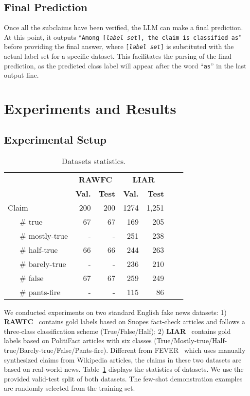 \documentclass[11pt]{article}
\begin{document}
\subsection{Final Prediction} Once all the subclaims have been verified, the LLM can make a final prediction. At this point, it outputs ``\texttt{Among [\textit{label set}], the claim is classified as}'' before providing the final answer, where \texttt{[\textit{label set}]} is substituted with the actual label set for a specific dataset. This facilitates the parsing of the final prediction, as the predicted class label will appear after the word ``\texttt{as}'' in the last output line.

\section{Experiments and Results}
\subsection{Experimental Setup}
\begin{table}[t!]
\centering

\begin{tabular}{lrrrrrr}
\toprule

& \multicolumn{2}{c}{\textbf{RAWFC}}&\multicolumn{2}{c}{\textbf{LIAR}}\\

 \cmidrule(lr){2-3} \cmidrule(lr){4-5}
 & \textbf{Val.} & \textbf{Test}& \textbf{Val.} & \textbf{Test}\\
 \midrule
Claim & 200 & 200& 1274 & 1,251  \\
~~~\# true & 67 & 67& 169 & 205  \\
~~~\# mostly-true&-&- & 251 & 238  \\
~~~\# half-true & 66 & 66 & 244 & 263  \\
~~~\# barely-true&-&- & 236 & 210  \\
~~~\# false& 67 & 67 & 259 & 249 \\
~~~\# pants-fire&-&- & 115 & 86 \\
\bottomrule

\end{tabular}
\caption{Datasets statistics.}
\label{tbl_datasta}

\end{table}
We conducted experiments on two standard English fake news datasets: 1)  \textbf{RAWFC}~\cite{yang2022coarse} contains gold labels based on Snopes fact-check articles and follows a three-class classification scheme (True/False/Half); 2) \textbf{LIAR}~\cite{wang2017liar} contains gold labels based on PolitiFact articles with six classes (True/Mostly-true/Half-true/Barely-true/False/Pants-fire). Different from FEVER~\cite{thorne2018fever} which uses manually synthesized claims from  Wikipedia articles, the claims in these two datasets are based on real-world news. 
Table~\ref{tbl_datasta} displays the statistics of datasets. We use the provided valid-test split of both datasets. The few-shot demonstration examples are randomly selected from the training set.
\end{document}
